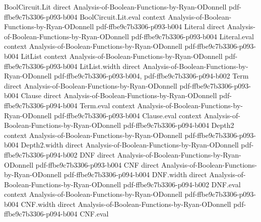 \begin{lemma}
\label{DecisionTree.fourierCoeff_sum_chiS}
\leanok
{}
\proofstep
  {BoolCircuit.Lit}
  {direct}
  {Analysis-of-Boolean-Functions-by-Ryan-ODonnell}
  {pdf-ffbe9c7b3306-p093-b004}
\proofstep
  {BoolCircuit.Lit.eval}
  {context}
  {Analysis-of-Boolean-Functions-by-Ryan-ODonnell}
  {pdf-ffbe9c7b3306-p093-b004}
\proofstep
  {Literal}
  {direct}
  {Analysis-of-Boolean-Functions-by-Ryan-ODonnell}
  {pdf-ffbe9c7b3306-p093-b004}
\proofstep
  {Literal.eval}
  {context}
  {Analysis-of-Boolean-Functions-by-Ryan-ODonnell}
  {pdf-ffbe9c7b3306-p093-b004}
\proofstep
  {LitList}
  {context}
  {Analysis-of-Boolean-Functions-by-Ryan-ODonnell}
  {pdf-ffbe9c7b3306-p093-b004}
\proofstep
  {LitList.width}
  {direct}
  {Analysis-of-Boolean-Functions-by-Ryan-ODonnell}
  {pdf-ffbe9c7b3306-p093-b004,
    pdf-ffbe9c7b3306-p094-b002}
\proofstep
  {Term}
  {direct}
  {Analysis-of-Boolean-Functions-by-Ryan-ODonnell}
  {pdf-ffbe9c7b3306-p093-b004}
\proofstep
  {Clause}
  {direct}
  {Analysis-of-Boolean-Functions-by-Ryan-ODonnell}
  {pdf-ffbe9c7b3306-p094-b004}
\proofstep
  {Term.eval}
  {context}
  {Analysis-of-Boolean-Functions-by-Ryan-ODonnell}
  {pdf-ffbe9c7b3306-p093-b004}
\proofstep
  {Clause.eval}
  {context}
  {Analysis-of-Boolean-Functions-by-Ryan-ODonnell}
  {pdf-ffbe9c7b3306-p094-b004}
\proofstep
  {Depth2}
  {context}
  {Analysis-of-Boolean-Functions-by-Ryan-ODonnell}
  {pdf-ffbe9c7b3306-p093-b004}
\proofstep
  {Depth2.width}
  {direct}
  {Analysis-of-Boolean-Functions-by-Ryan-ODonnell}
  {pdf-ffbe9c7b3306-p094-b002}
\proofstep
  {DNF}
  {direct}
  {Analysis-of-Boolean-Functions-by-Ryan-ODonnell}
  {pdf-ffbe9c7b3306-p093-b004}
\proofstep
  {CNF}
  {direct}
  {Analysis-of-Boolean-Functions-by-Ryan-ODonnell}
  {pdf-ffbe9c7b3306-p094-b004}
\proofstep
  {DNF.width}
  {direct}
  {Analysis-of-Boolean-Functions-by-Ryan-ODonnell}
  {pdf-ffbe9c7b3306-p094-b002}
\proofstep
  {DNF.eval}
  {context}
  {Analysis-of-Boolean-Functions-by-Ryan-ODonnell}
  {pdf-ffbe9c7b3306-p093-b004}
\proofstep
  {CNF.width}
  {direct}
  {Analysis-of-Boolean-Functions-by-Ryan-ODonnell}
  {pdf-ffbe9c7b3306-p094-b004}
\proofstep
  {CNF.eval}

\end{lemma}
